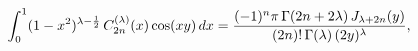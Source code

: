 \[\int_{0}^{1}(1-x^{2})^{\lambda-\frac{1}{2}}\mathop{C^{(\lambda)}_{2n}\/}%
\nolimits\!\left(x\right)\mathop{\cos\/}\nolimits\!\left(xy\right)dx=\frac{(-1%
)^{n}\pi\mathop{\Gamma\/}\nolimits\!\left(2n+2\lambda\right)\mathop{J_{\lambda%
+2n}\/}\nolimits\!\left(y\right)}{(2n)!\mathop{\Gamma\/}\nolimits\!\left(%
\lambda\right)(2y)^{\lambda}},\]